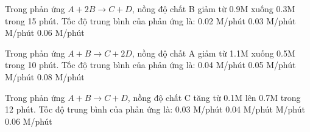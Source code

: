 \documentclass[Main.tex]{subfiles}
\begin{document}
    \begin{ex}
        Trong phản ứng $A + 2B \rightarrow C + D$, nồng độ chất B giảm từ 0.9M xuống 0.3M trong 15 phút. Tốc độ trung bình của phản ứng là:
        \choice
        {0.02 M/phút}
        {0.03 M/phút}
        { M/phút}
        {0.06 M/phút}
        \loigiai{
            \[
                v_{tb} = \frac{0.9 - 0.3}{15} = 0.04 \text{ M/phút}
            \]
        }
    \end{ex}
    \begin{ex}
        Trong phản ứng $A + B \rightarrow C + 2D$, nồng độ chất A giảm từ 1.1M xuống 0.5M trong 10 phút. Tốc độ trung bình của phản ứng là:
         \choice
        {0.04 M/phút}
        {0.05 M/phút}
        { M/phút}
        {0.08 M/phút}
        \loigiai{
            \[
                v_{tb} = \frac{1.1 - 0.5}{10} = 0.06 \text{ M/phút}
            \]
        }
    \end{ex}
    \begin{ex}
        Trong phản ứng $A + B \rightarrow C + D$, nồng độ chất C tăng từ 0.1M lên 0.7M trong 12 phút. Tốc độ trung bình của phản ứng là:
        \choice
        {0.03 M/phút}
        {0.04 M/phút}
        { M/phút}
        {0.06 M/phút}
        \loigiai{
            \[
                v_{tb} = \frac{0.7 - 0.1}{12} = 0.05 \text{ M/phút}
            \]
        }
    \end{ex}
\end{document}
